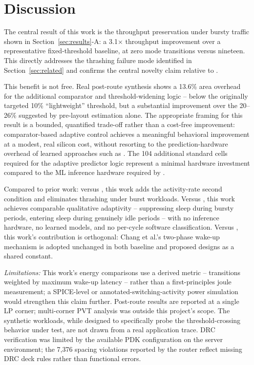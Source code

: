 \section{Discussion}
\label{sec:discussion}

The central result of this work is the throughput preservation under bursty traffic shown in Section~\ref{sec:results}-A: a 3.1$\times$ throughput improvement over a representative fixed-threshold baseline, at zero mode transitions versus nineteen. This directly addresses the thrashing failure mode identified in Section~\ref{sec:related} and confirms the central novelty claim relative to \cite{agarwal2006}.

This benefit is not free. Real post-route synthesis shows a 13.6\% area overhead for the additional comparator and threshold-widening logic -- below the originally targeted 10\% ``lightweight'' threshold, but a substantial improvement over the 20--26\% suggested by pre-layout estimation alone. The appropriate framing for this result is a bounded, quantified trade-off rather than a cost-free improvement: comparator-based adaptive control achieves a meaningful behavioral improvement at a modest, real silicon cost, without resorting to the prediction-hardware overhead of learned approaches such as \cite{karthikeyan2025}. The 104 additional standard cells required for the adaptive predictor logic represent a minimal hardware investment compared to the ML inference hardware required by \cite{karthikeyan2025}.

Compared to prior work: versus \cite{agarwal2006}, this work adds the activity-rate second condition and eliminates thrashing under burst workloads. Versus \cite{karthikeyan2025}, this work achieves comparable qualitative adaptivity -- suppressing sleep during bursty periods, entering sleep during genuinely idle periods -- with no inference hardware, no learned models, and no per-cycle software classification. Versus \cite{chang2012}, this work's contribution is orthogonal: Chang et al.'s two-phase wake-up mechanism is adopted unchanged in both baseline and proposed designs as a shared constant.

\noindent\textit{Limitations:}
This work's energy comparisons use a derived metric -- transitions weighted by maximum wake-up latency -- rather than a first-principles joule measurement; a SPICE-level or annotated-switching-activity power simulation would strengthen this claim further. Post-route results are reported at a single LP corner; multi-corner PVT analysis was outside this project's scope. The synthetic workloads, while designed to specifically probe the threshold-crossing behavior under test, are not drawn from a real application trace. DRC verification was limited by the available PDK configuration on the server environment; the 7,376 spacing violations reported by the router reflect missing DRC deck rules rather than functional errors.
